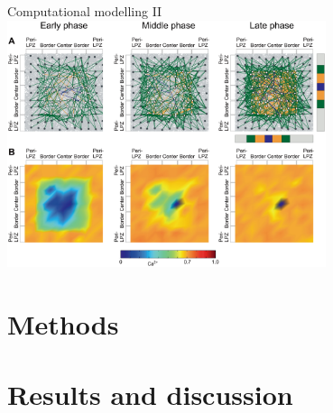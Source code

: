 \begin{frame}[c]{Computational modelling II}
  \centering
  \includegraphics[width=0.7\textwidth]{99_images/butz3.png}
\end{frame}

\section{Methods}
\section{Results and discussion}


